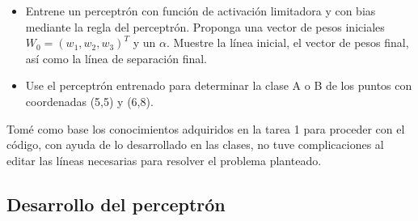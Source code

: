 \begin{itemize}
    \item Entrene un perceptrón con función de activación limitadora y con bias mediante la regla del perceptrón. Proponga una vector de pesos iniciales $W_0=(w_1,w_2,w_3 )^T$ y un $\alpha$. Muestre la línea inicial, el vector de pesos final, así como la línea de separación final.
	\item Use el perceptrón entrenado para determinar la clase A o B de los puntos con coordenadas (5,5) y (6,8).
\end{itemize}

Tomé como base los conocimientos adquiridos en la tarea 1 para proceder con el código, con ayuda de
lo desarrollado en las clases, no tuve complicaciones al editar las líneas necesarias para resolver el 
problema planteado.

\newpage
\subsection{Desarrollo del perceptrón}

\clearpage